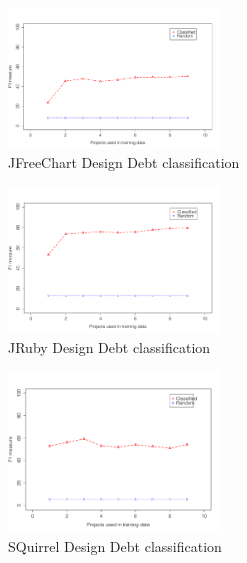 \begin{figure}[thb!]
  \centering
  \includegraphics[width=0.50\textwidth]{figures/design_jfreechart.pdf}
  \vspace{-3mm}
  \caption{JFreeChart Design Debt classification}
  \label{fig:design_jfreechart}
\end{figure}

\begin{figure}[thb!]
  \centering
  \includegraphics[width=0.50\textwidth]{figures/design_jruby.pdf}
  \vspace{-3mm}
  \caption{JRuby Design Debt classification}
  \label{fig:design_jruby}
\end{figure}

\begin{figure}[thb!]
  \centering
  \includegraphics[width=0.50\textwidth]{figures/design_sql.pdf}
  \vspace{-3mm}
  \caption{SQuirrel Design Debt classification}
  \label{fig:design_sql}
\end{figure}

\clearpage
 
